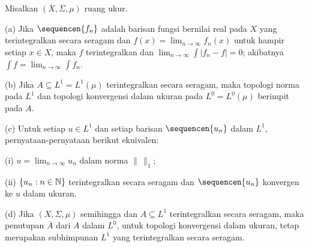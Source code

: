  Misalkan $(X,\Sigma,\mu)$ ruang ukur.

\ifdim\pagewidth>467pt\fontdimen4\tenrm=1.5pt\fi (a) Jika $\sequencen{f_n}$
adalah barisan fungsi bernilai real pada $X$ yang terintegralkan secara
seragam dan $f(x)=\lim_{n\to\infty}f_n(x)$ untuk hampir setiap $x\in X$, maka $f$
terintegralkan dan $\lim_{n\to\infty}\int|f_n-f|=0$; akibatnya $\int
f=\lim_{n\to\infty}\int f_n$. \tenrm=1.11pt

(b) Jika $A\subseteq L^1=L^1(\mu)$ terintegralkan secara seragam, maka
topologi norma pada $L^1$ dan topologi konvergensi dalam ukuran pada
$L^0=L^0(\mu)$ berimpit pada $A$.

(c) Untuk setiap $u\in L^1$ dan setiap barisan $\sequencen{u_n}$ dalam $L^1$,
pernyataan-pernyataan berikut ekuivalen:

\qquad(i) $u=\lim_{n\to\infty}u_n$ dalam norma $\|\,\|_1$;

\qquad(ii) $\{u_n:n\in\Bbb N\}$ terintegralkan secara seragam dan
$\sequencen{u_n}$ konvergen ke $u$ dalam ukuran.

(d) Jika $(X,\Sigma,\mu)$ semihingga dan $A\subseteq L^1$ terintegralkan secara
seragam, maka penutupan $\overline{A}$ dari $A$ dalam $L^0$, untuk topologi
konvergensi dalam ukuran, tetap merupakan subhimpunan $L^1$ yang terintegralkan
secara seragam.

